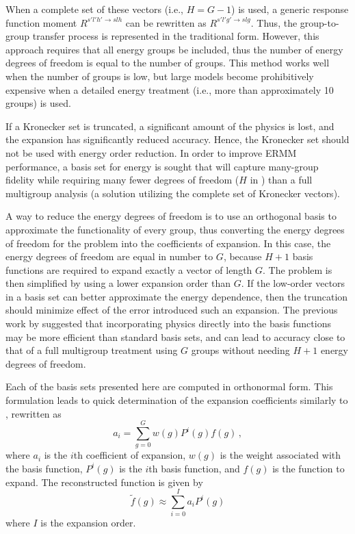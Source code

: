 When a complete set  of these vectors (i.e., $H = G-1$) is used, a generic 
response function moment $R^{s'l'h' \to slh}$ can be rewritten as $R^{s'l'g' \to 
slg}$.  Thus, the group-to-group transfer process is represented in the 
traditional form.  However, this approach requires that 
all energy groups be included, thus the number of energy degrees of freedom is 
equal to the number of groups.  This method works well when the number of groups 
is low, but large models become prohibitively expensive when a detailed energy 
treatment (i.e., more than approximately 10 groups) is used. 

If a Kronecker set is truncated, a significant amount of the physics is lost, 
and the expansion has significantly reduced accuracy. Hence, the Kronecker set 
should not be used with energy order reduction. In order to improve ERMM 
performance, a basis set for energy is sought that will capture many-group 
fidelity while requiring many fewer degrees of freedom ($H$ in 
) than a full 
multigroup analysis (a solution utilizing the complete set of Kronecker 
vectors).

A way to reduce the energy degrees of freedom is to use an orthogonal basis to 
approximate the functionality of every group, thus converting the energy degrees 
of freedom
for the problem into the coefficients of expansion. In this case, the energy 
degrees of freedom are equal in number to $G$, because $H+1$ basis functions 
are required to expand exactly a vector of length $G$.  The problem is then 
simplified by using a lower expansion order than $G$.  If the low-order 
vectors in a basis set can better approximate the energy dependence, then the 
truncation should minimize effect of the error introduced such an expansion.  
The previous work by \citet{Roberts2014} suggested that incorporating physics 
directly into the basis functions may be more efficient than standard basis 
sets, and can lead to accuracy close to that of a 
full multigroup treatment using $G$ groups without needing $H+1$ energy degrees 
of freedom.

Each of the basis sets presented here are computed in orthonormal 
form.  This formulation leads to quick determination of the expansion 
coefficients similarly to 
, rewritten as
\begin{equation}
    a_i = \sum_{g=0}^{G}w(g) P^i(g) f(g) \, ,
  \label{eq:coefficients}
\end{equation}
where $a_i$ is the $i$th coefficient of expansion, $w(g)$ is the weight 
associated with the basis function, $P^i(g)$ is the $i$th basis function, and
$f(g)$ 
is the function to expand. The 
reconstructed function is given by
\begin{equation}
    \tilde{f}(g) \approx \sum_{i=0}^{I} a_i P^i(g)
  \label{eq:expansion}
\end{equation}
where $I$ is the expansion order.  

